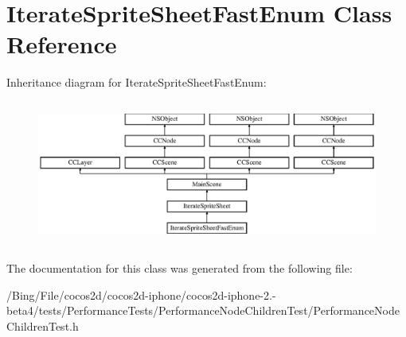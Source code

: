 \hypertarget{interface_iterate_sprite_sheet_fast_enum}{\section{Iterate\-Sprite\-Sheet\-Fast\-Enum Class Reference}
\label{interface_iterate_sprite_sheet_fast_enum}
}
Inheritance diagram for Iterate\-Sprite\-Sheet\-Fast\-Enum\-:\begin{figure}[H]
\begin{center}
\leavevmode
\includegraphics[height=4.800000cm]{interface_iterate_sprite_sheet_fast_enum}
\end{center}
\end{figure}


The documentation for this class was generated from the following file\-:\begin{DoxyCompactItemize}
\item 
/\-Bing/\-File/cocos2d/cocos2d-\/iphone/cocos2d-\/iphone-\/2.-\/beta4/tests/\-Performance\-Tests/\-Performance\-Node\-Children\-Test/Performance\-Node\-Children\-Test.\-h\end{DoxyCompactItemize}
